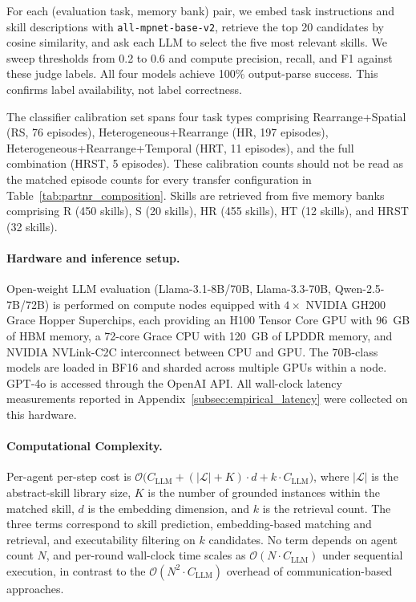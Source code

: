 \documentclass{article}
\theoremstyle{plain}
\theoremstyle{definition}
\theoremstyle{remark}
\begin{document}
For each (evaluation task, memory bank) pair, we embed task instructions and skill descriptions with \texttt{all-mpnet-base-v2}, retrieve the top 20 candidates by cosine similarity, and ask each LLM to select the five most relevant skills. We sweep thresholds from 0.2 to 0.6 and compute precision, recall, and F1 against these judge labels. All four models achieve 100\% output-parse success. This confirms label availability, not label correctness.

The classifier calibration set spans four task types comprising Rearrange+Spatial (RS, 76 episodes), Heterogeneous+Rearrange (HR, 197 episodes), Heterogeneous+Rearrange+Temporal (HRT, 11 episodes), and the full combination (HRST, 5 episodes). These calibration counts should not be read as the matched episode counts for every transfer configuration in Table~\ref{tab:partnr_composition}. Skills are retrieved from five memory banks comprising R (450 skills), S (20 skills), HR (455 skills), HT (12 skills), and HRST (32 skills).

\paragraph{Hardware and inference setup.} Open-weight LLM evaluation (Llama-3.1-8B/70B, Llama-3.3-70B, Qwen-2.5-7B/72B) is performed on compute nodes equipped with $4\times$ NVIDIA GH200 Grace Hopper Superchips, each providing an H100 Tensor Core GPU with 96~GB of HBM memory, a 72-core Grace CPU with 120~GB of LPDDR memory, and NVIDIA NVLink-C2C interconnect between CPU and GPU. The 70B-class models are loaded in BF16 and sharded across multiple GPUs within a node. GPT-4o is accessed through the OpenAI API. All wall-clock latency measurements reported in Appendix~\ref{subsec:empirical_latency} were collected on this hardware.

\paragraph{Computational Complexity.}
Per-agent per-step cost is $\mathcal{O}\big(C_{\text{LLM}} + (|\mathcal{L}| + K) \cdot d + k \cdot C_{\text{LLM}}\big)$, where $|\mathcal{L}|$ is the abstract-skill library size, $K$ is the number of grounded instances within the matched skill, $d$ is the embedding dimension, and $k$ is the retrieval count. The three terms correspond to skill prediction, embedding-based matching and retrieval, and executability filtering on $k$ candidates. No term depends on agent count $N$, and per-round wall-clock time scales as $\mathcal{O}(N \cdot C_{\text{LLM}})$ under sequential execution, in contrast to the $\mathcal{O}(N^2 \cdot C_{\text{LLM}})$ overhead of communication-based approaches.
\end{document}
